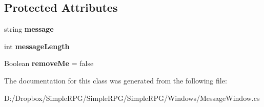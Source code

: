 \subsection*{Protected Attributes}
\begin{DoxyCompactItemize}
\item 
\hypertarget{class_simple_r_p_g_1_1_windows_1_1_message_window_a69bd0d73bf3f010d325f9162e59331be}{string {\bfseries message}}\label{class_simple_r_p_g_1_1_windows_1_1_message_window_a69bd0d73bf3f010d325f9162e59331be}

\item 
\hypertarget{class_simple_r_p_g_1_1_windows_1_1_message_window_a90d77890d714f454bb14a131e409821a}{int {\bfseries message\+Length}}\label{class_simple_r_p_g_1_1_windows_1_1_message_window_a90d77890d714f454bb14a131e409821a}

\item 
\hypertarget{class_simple_r_p_g_1_1_windows_1_1_message_window_aeaf30e10ea84c29970d99d2162439050}{Boolean {\bfseries remove\+Me} = false}\label{class_simple_r_p_g_1_1_windows_1_1_message_window_aeaf30e10ea84c29970d99d2162439050}

\end{DoxyCompactItemize}


The documentation for this class was generated from the following file\+:\begin{DoxyCompactItemize}
\item 
D\+:/\+Dropbox/\+Simple\+R\+P\+G/\+Simple\+R\+P\+G/\+Simple\+R\+P\+G/\+Windows/Message\+Window.\+cs\end{DoxyCompactItemize}
